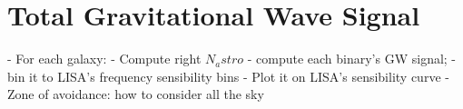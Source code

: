 \chapter{Total Gravitational Wave Signal}
- For each galaxy:
    - Compute right $N_astro$
    - compute each binary's GW signal;
    - bin it to LISA's frequency sensibility bins
    - Plot it on LISA's sensibility curve
- Zone of avoidance: how to consider all the sky

